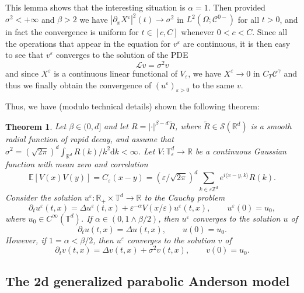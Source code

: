 \documentclass[a4paper,11pt]{article}
\newcommand{\mathd}{\mathrm{d}}
\newtheorem{theorem}{Theorem}
\newcommand{\LL}{\mathscr{L}}
\newcommand{\CS}{\mathscr{S}}
\newcommand{\CC}{\mathscr{C}}
\begin{document}
This lemma shows that the interesting situation is $\alpha = 1$. Then provided
$\sigma^2 < + \infty$ and $\beta > 2$ we have $| \partial_x X^{\varepsilon} |^2
(t) \rightarrow \sigma^2$ in $L^2(\Omega; \CC^{0 -})$ for all $t > 0$, and in fact the
convergence is uniform for $t \in [c, C]$ whenever $0 < c < C$. Since all the operations that appear in the equation for $v^\varepsilon$ are continuous, it is then easy to see that $v^{\varepsilon}$ converges to the solution of the PDE
\begin{equation}
  \LL v = \sigma^2 v \label{eq:homog}
\end{equation}
and since $X^\varepsilon$ is a continuous linear functional of $V_\varepsilon$, we have $X^{\varepsilon} \rightarrow 0$ in $C_T \CC^{\gamma}$ and thus we finally obtain the convergence of $(u^{\varepsilon})_{\varepsilon > 0}$ to the same
$v$.

Thus, we have (modulo technical details) shown the following theorem:
\begin{theorem}\label{thm:homogenization}
   Let $\beta \in (0,d]$ and let $R = | \cdot |^{\beta - d} \tilde{R}$, where $\tilde{R} \in \CS (\mathbb{R}^d)$ is a smooth radial function of rapid decay, and assume that $\sigma^2 = ( \sqrt{2 \pi} )^d \int_{\mathbb{R}^d} R(k)/k^2 \mathd k < \infty$. Let $V \colon \mathbb{T}^d_{\varepsilon} \rightarrow \mathbb{R}$ be a continuous Gaussian function with mean zero and correlation
\[
   \mathbb{E} [V (x) V (y)] = C_{\varepsilon} (x - y) = ( \varepsilon / \sqrt{2 \pi} )^d \sum_{k \in \varepsilon \mathbb{Z}^d} e^{i \langle x - y, k \rangle} R (k).
\]
Consider the solution $u^{\varepsilon} : \mathbb{R}_+ \times
\mathbb{T}^d \rightarrow \mathbb{R}$ to the Cauchy problem
\[
   \partial_t u^{\varepsilon} (t, x) = \Delta u^{\varepsilon} (t, x) +
   \varepsilon^{- \alpha} V (x / \varepsilon) u^{\varepsilon} (t, x),
   \hspace{2em} u^{\varepsilon} (0) = u_0,
\]
where $u_0 \in C^{\infty}(\mathbb{T}^d)$. If $\alpha \in (0, 1 \wedge \beta/2)$, then $u^\varepsilon$ converges to the solution $u$ of
\[
   \partial_t u (t, x) = \Delta u (t, x), \hspace{2em} u (0) = u_0.
\]
However, if $1 = \alpha < \beta/2$, then $u^\varepsilon$ converges to the solution $v$ of
\[
   \partial_t v (t, x) = \Delta v (t, x) + \sigma^2 v(t,x), \hspace{2em} v(0) = u_0.
\]
\end{theorem}


\subsection{The 2d generalized parabolic Anderson model}
\end{document}
